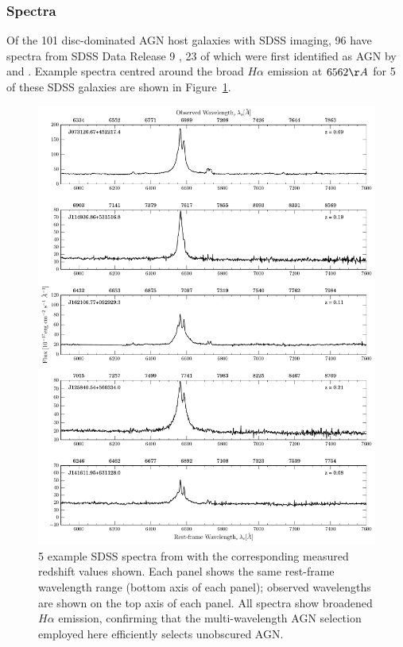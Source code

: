 \subsubsection{Spectra}\label{sec:spectra}

Of the 101 disc-dominated AGN host galaxies with SDSS imaging, 96 have spectra from SDSS Data Release 9 \citep{ahn12}, 23 of which were first identified as AGN by \cite{shen08} and \cite{edelson12}. Example spectra centred around the broad $H\alpha$ emission at $6562\AA$ for 5 of these SDSS galaxies are shown in Figure~\ref{fig:SDSSspectra}.

\begin{figure}
\centering
\includegraphics[height=0.8\textheight]{agn/sample_sdss_spectra.pdf}
\caption[Optical SDSS spectra of 5 galaxies in the \textsc{bulgeless} sample]{5 example SDSS spectra from with the corresponding measured redshift values shown. Each panel shows the same rest-frame wavelength range (bottom axis of each panel); observed wavelengths are shown on the top axis of each panel. All spectra show broadened  $H\alpha$ emission, confirming that the multi-wavelength AGN selection employed here efficiently selects unobscured AGN.}
\label{fig:SDSSspectra}
\end{figure}

